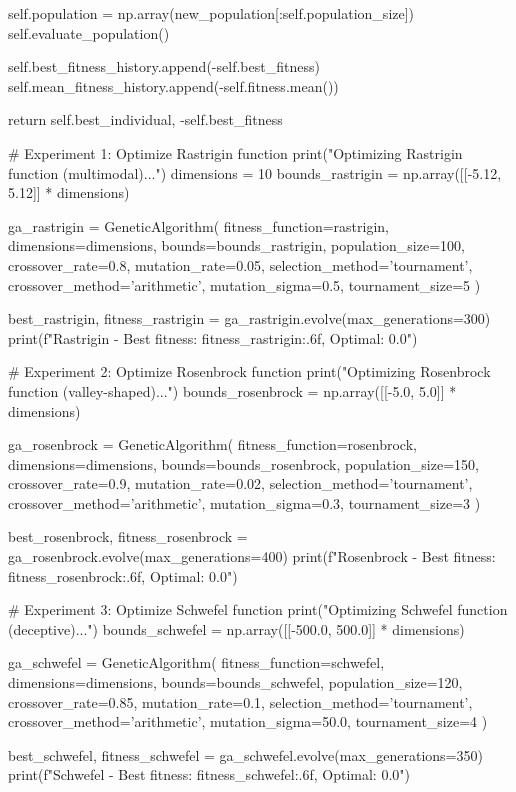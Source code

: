 \documentclass[a4paper, 11pt]{article}
\begin{document}
\begin{pycode}
            self.population = np.array(new_population[:self.population_size])
            self.evaluate_population()

            self.best_fitness_history.append(-self.best_fitness)
            self.mean_fitness_history.append(-self.fitness.mean())

        return self.best_individual, -self.best_fitness

# Experiment 1: Optimize Rastrigin function
print("Optimizing Rastrigin function (multimodal)...")
dimensions = 10
bounds_rastrigin = np.array([[-5.12, 5.12]] * dimensions)

ga_rastrigin = GeneticAlgorithm(
    fitness_function=rastrigin,
    dimensions=dimensions,
    bounds=bounds_rastrigin,
    population_size=100,
    crossover_rate=0.8,
    mutation_rate=0.05,
    selection_method='tournament',
    crossover_method='arithmetic',
    mutation_sigma=0.5,
    tournament_size=5
)

best_rastrigin, fitness_rastrigin = ga_rastrigin.evolve(max_generations=300)
print(f"Rastrigin - Best fitness: {fitness_rastrigin:.6f}, Optimal: 0.0")

# Experiment 2: Optimize Rosenbrock function
print("Optimizing Rosenbrock function (valley-shaped)...")
bounds_rosenbrock = np.array([[-5.0, 5.0]] * dimensions)

ga_rosenbrock = GeneticAlgorithm(
    fitness_function=rosenbrock,
    dimensions=dimensions,
    bounds=bounds_rosenbrock,
    population_size=150,
    crossover_rate=0.9,
    mutation_rate=0.02,
    selection_method='tournament',
    crossover_method='arithmetic',
    mutation_sigma=0.3,
    tournament_size=3
)

best_rosenbrock, fitness_rosenbrock = ga_rosenbrock.evolve(max_generations=400)
print(f"Rosenbrock - Best fitness: {fitness_rosenbrock:.6f}, Optimal: 0.0")

# Experiment 3: Optimize Schwefel function
print("Optimizing Schwefel function (deceptive)...")
bounds_schwefel = np.array([[-500.0, 500.0]] * dimensions)

ga_schwefel = GeneticAlgorithm(
    fitness_function=schwefel,
    dimensions=dimensions,
    bounds=bounds_schwefel,
    population_size=120,
    crossover_rate=0.85,
    mutation_rate=0.1,
    selection_method='tournament',
    crossover_method='arithmetic',
    mutation_sigma=50.0,
    tournament_size=4
)

best_schwefel, fitness_schwefel = ga_schwefel.evolve(max_generations=350)
print(f"Schwefel - Best fitness: {fitness_schwefel:.6f}, Optimal: 0.0")


\end{pycode}
\end{document}
